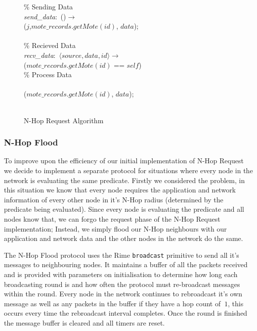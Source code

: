 \begin{figure}[H]
\begin{boxedminipage}{\linewidth}
    \null\qq \% Sending Data\\
    \null\qq \emph{send\_data}:~()$\rightarrow$\\
    \null\qq\qq {}($j$,$mote\_records.getMote(id)$, $data$);\\~\\
    \null\qq \% Recieved Data\\
    \null\qq \emph{recv\_data}:~$\langle source, data, id\rangle \rightarrow$\\
    \null\qq\qq {} ($mote\_records.getMote(id)$ == $self$) \\
    \null\qq\qq\qq \% Process Data\\
    \null\qq\qq {}\\
    \null\qq\qq\qq {}($mote\_records.getMote(id)$, $data$);\\
    \null\qq\qq {}\\
  \end{boxedminipage}
  \caption{N-Hop Request Algorithm}
  \label{fig:n-hop-req-algorithm}
\end{figure}

\subsubsection{N-Hop Flood}

To improve upon the efficiency of our initial implementation of N-Hop Request we decide to implement a separate protocol for situations where every node in the network is evaluating the same predicate. Firstly we considered the problem, in this situation we know that every node requires the application and network information of every other node in it's N-Hop radius (determined by the predicate being evaluated). Since every node is evaluating the predicate and all nodes know that, we can forgo the request phase of the N-Hop Request implementation; Instead, we simply flood our N-Hop neighbours with our application and network data and the other nodes in the network do the same. 

The N-Hop Flood protocol uses the Rime \verb|broadcast| primitive to send all it's messages to neighbouring nodes. It maintains a buffer of all the packets received and is provided with parameters on initialisation to determine how long each broadcasting round is and how often the protocol must re-broadcast messages within the round. Every node in the network continues to rebroadcast it's own message as well as any packets in the buffer if they have a hop count of $\> 1$, this occurs every time the rebroadcast interval completes. Once the round is finished the message buffer is cleared and all timers are reset.

